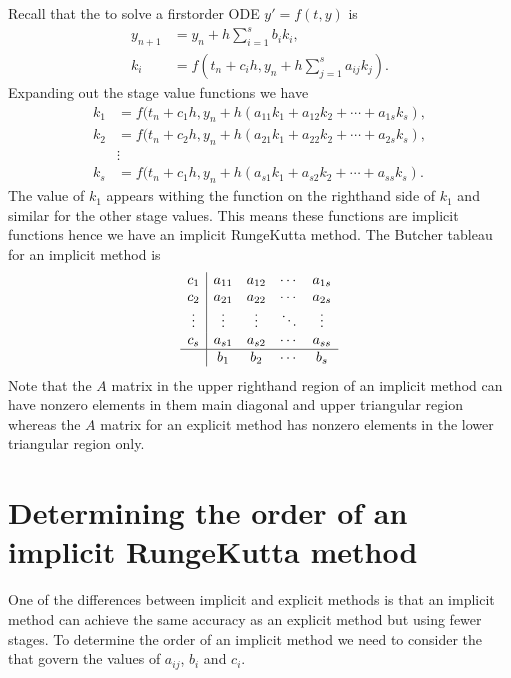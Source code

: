 \documentclass[letterpaper,10pt,english]{jupyterBook}
\begin{document}
\sphinxAtStartPar
Recall that the {\hyperref[\detokenize{2_ERKs/2.0_ERKs:rk-definition}]{}} to solve a first\sphinxhyphen{}order ODE \(y'=f(t,y)\) is
\begin{align*}
   y_{n+1} &=y_n + h \sum_{i=1}^s b_i k_i,\\
   k_i &=f(t_n +c_i h,y_n + h \sum_{j=1}^s a_{ij} k_j).
\end{align*}
\sphinxAtStartPar
Expanding out the stage value functions we have
\begin{align*}
    k_1 &= f(t_n + c_1 h, y_n + h (a_{11} k_1 + a_{12} k_2 + \cdots + a_{1s} k_s), \\
    k_2 &= f(t_n + c_2 h, y_n + h (a_{21} k_1 + a_{22} k_2 + \cdots + a_{2s} k_s), \\
    & \vdots \\
    k_s &= f(t_n + c_1 h, y_n + h (a_{s1} k_1 + a_{s2} k_2 + \cdots + a_{ss} k_s).
\end{align*}
\sphinxAtStartPar
The value of \(k_1\) appears withing the function on the right\sphinxhyphen{}hand side of \(k_1\) and similar for the other stage values. This means these functions are implicit functions hence we have an implicit Runge\sphinxhyphen{}Kutta method. The Butcher tableau for an implicit method is
\begin{align*}
   \begin{array}{c|cccc}
      c_1  & a_{11}  & a_{12}  & \cdots  & a_{1s} \\
      c_2  & a_{21}  & a_{22}  & \cdots  & a_{2s} \\
      \vdots  & \vdots  & \vdots  & \ddots  & \vdots \\
      c_s  & a_{s1}  & a_{s2}  & \cdots  & a_{ss} \\ \hline
       & b_1  & b_2  & \cdots  & b_s 
      \end{array}
\end{align*}
\sphinxAtStartPar
Note that the \(A\) matrix in the upper right\sphinxhyphen{}hand region of an implicit method can have non\sphinxhyphen{}zero elements in them main diagonal and upper triangular region whereas the \(A\) matrix for an explicit method has non\sphinxhyphen{}zero elements in the lower triangular region only.


\section{Determining the order of an implicit Runge\sphinxhyphen{}Kutta method}
\label{\detokenize{3_IRKs/3.0_IRKs:determining-the-order-of-an-implicit-runge-kutta-method}}\label{\detokenize{3_IRKs/3.0_IRKs:order-of-irk-section}}
\sphinxAtStartPar
One of the differences between implicit and explicit methods is that an implicit method can achieve the same accuracy as an explicit method but using fewer stages. To determine the order of an implicit method we need to consider the  that govern the values of \(a_{ij}\), \(b_i\) and \(c_i\).
\end{document}
